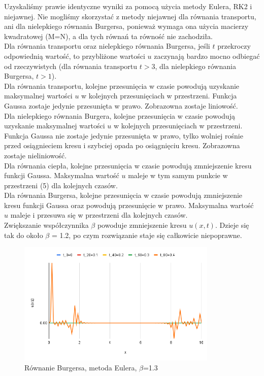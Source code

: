 \documentclass[a4paper,12pt]{article}
\begin{document}
Uzyskaliśmy prawie identyczne wyniki za pomocą użycia metody Eulera, RK2 i niejawnej. Nie mogliśmy skorzystać z metody niejawnej dla równania transportu, ani dla nielepkiego równania Burgersa, ponieważ wymaga ona użycia macierzy kwadratowej (M=N), a dla tych równań ta równość nie zachodziła.\\

Dla równania transportu oraz nielepkiego równania Burgersa, jeśli $t$ przekroczy odpowiednią wartość, to przybliżone wartości $u$ zaczynają bardzo mocno odbiegać od rzeczywistych (dla równania transportu $t>3$, dla nielepkiego równania Burgersa, $t>1$).\\

Dla równania transportu, kolejne przesunięcia w czasie powodują uzyskanie maksymalnej wartości $u$ w kolejnych przesunięciach w przestrzeni.  Funkcja Gaussa zostaje jedynie przesunięta w prawo.  Zobrazowna zostaje liniowość.\\

Dla nielepkiego równania Burgera, kolejne przesunięcia w czasie powodują uzyskanie maksymalnej wartości $u$ w kolejnych przesunięciach w przestrzeni. Funkcja Gaussa nie zostaje jedynie przesunięta w prawo, tylko wolniej rośnie przed osiągnieciem kresu i szybciej opada po osiągnięciu kresu. Zobrazowna zostaje nieliniowość.\\

Dla równania ciepła, kolejne przesunięcia w czasie powodują zmniejszenie kresu funkcji Gaussa. Maksymalna wartość $u$ maleje w tym samym punkcie w przestrzeni (5) dla kolejnych czasów.\\ 

Dla równania Burgersa, kolejne przesunięcia w czasie powodują zmniejszenie kresu funkcji Gaussa oraz powodują przesunięcie w prawo. Maksymalna wartość $u$ maleje i przesuwa się w przestrzeni dla kolejnych czasów.\\

Zwiększanie współczynnika $\beta$ powoduje zmniejszenie kresu $u(x,t)$. Dzieje się tak do około $\beta$ = 1.2, po czym rozwiązanie staje się całkowicie niepoprawne.\\
\begin{figure}[h]
\caption{Równanie Burgersa, metoda Eulera, $\beta$=1.3}
\centering
\includegraphics[width=0.85\textwidth]{rys/10.png}
\end{figure}
\end{document}
